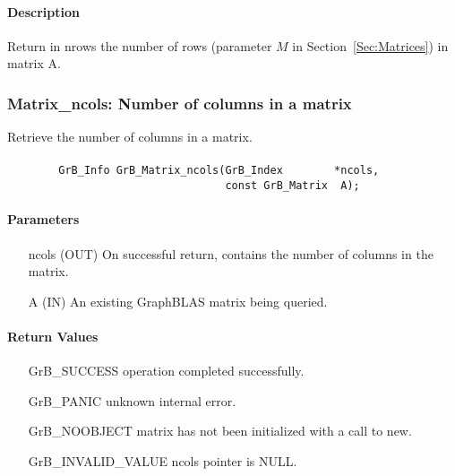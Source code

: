 \paragraph{Description}

Return in {\sf nrows} the number of rows (parameter $M$ in Section~\ref{Sec:Matrices}) in matrix {\sf A}.

\subsubsection{{\sf Matrix\_ncols}: Number of columns in a matrix}

Retrieve the number of columns in a matrix.

\paragraph{\syntax}

\begin{verbatim}
        GrB_Info GrB_Matrix_ncols(GrB_Index        *ncols,
                                  const GrB_Matrix  A);
\end{verbatim}

\paragraph{Parameters}

\begin{itemize}[leftmargin=1.1in]
    \item[{\sf ncols}] ({\sf OUT}) On successful return, contains the number of columns in the matrix.
    \item[{\sf A}] ({\sf IN}) An existing GraphBLAS matrix being queried.
\end{itemize}

\paragraph{Return Values}

\begin{itemize}[leftmargin=2.1in]
\item[{\sf GrB\_SUCCESS}]   operation completed successfully.
\item[{\sf GrB\_PANIC}]     unknown internal error.
\item[{\sf GrB\_NOOBJECT}]  matrix has not been initialized with a call to {\sf new}.
\item[{\sf GrB\_INVALID\_VALUE}]    {\sf ncols} pointer is {\sf NULL}.
\end{itemize}

